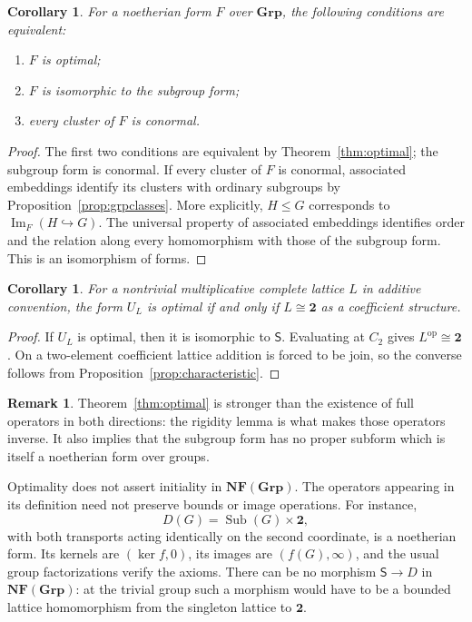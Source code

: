 \documentclass[12pt,a4paper]{amsart}
\newtheorem{corollary}[theorem]{Corollary}
\theoremstyle{definition}
\newtheorem{remark}[theorem]{Remark}
\newcommand{\Grp}{\mathbf{Grp}}
\newcommand{\Sub}{\operatorname{Sub}}
\newcommand{\im}{\operatorname{Im}}
\newcommand{\op}{\mathrm{op}}
\newcommand{\two}{\mathbf{2}}
\newcommand{\NF}{\mathbf{NF}}
\begin{document}
\begin{corollary}\label{cor:conormal}
For a noetherian form $F$ over $\Grp$, the following conditions are equivalent:
\begin{enumerate}[label=\textup{(\roman*)}]
\item $F$ is optimal;
\item $F$ is isomorphic to the subgroup form;
\item every cluster of $F$ is conormal.
\end{enumerate}
\end{corollary}
\begin{proof}
The first two conditions are equivalent by Theorem~\ref{thm:optimal}; the subgroup form is conormal. If every cluster of $F$ is conormal, associated embeddings identify its clusters with ordinary subgroups by Proposition~\ref{prop:grpclasses}. More explicitly,
$H\leq G$ corresponds to $\im_F(H\hookrightarrow G)$. The universal property of associated embeddings identifies order and the relation along every homomorphism with those of the subgroup form. This is an isomorphism of forms.
\end{proof}

\begin{corollary}\label{cor:optimalcoefficient}
For a nontrivial multiplicative complete lattice $L$ in additive convention, the form $U_L$ is optimal if and only if $L\cong\two$ as a coefficient structure.
\end{corollary}
\begin{proof}
If $U_L$ is optimal, then it is isomorphic to $\mathsf S$. Evaluating at $C_2$ gives $L^{\op}\cong\two$. On a two-element coefficient lattice addition is forced to be join, so the converse follows from Proposition~\ref{prop:characteristic}.
\end{proof}

\begin{remark}
Theorem~\ref{thm:optimal} is stronger than the existence of full operators in both directions: the rigidity lemma is what makes those operators inverse. It also implies that the subgroup form has no proper subform which is itself a noetherian form over groups.

Optimality does not assert initiality in $\NF(\Grp)$. The operators appearing in its definition need not preserve bounds or image operations. For instance,
\[
 D(G)=\Sub(G)\times\two,
\]
with both transports acting identically on the second coordinate, is a noetherian form. Its kernels are $(\ker f,0)$, its images are $(f(G),\infty)$, and the usual group factorizations verify the axioms. There can be no morphism $\mathsf S\to D$ in $\NF(\Grp)$: at the trivial group such a morphism would have to be a bounded lattice homomorphism from the singleton lattice to $\two$.
\end{remark}
\end{document}
